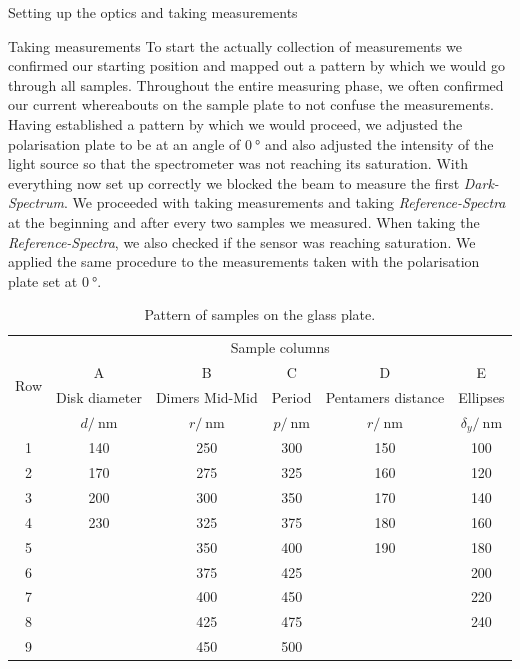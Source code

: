 \documentclass[pdftex, a4paper,11pt, twoside, UKenglish]{report}
\begin{document}
\begin{chapter}{Setting up the optics and taking measurements}
    
    
    \begin{section}{Taking measurements}
      \label{chp:SetupMeasuring}
      To start the actually collection of measurements we confirmed our starting
      position and mapped out a pattern by which we would go through all
      samples. Throughout the entire measuring phase, we often confirmed our
      current whereabouts on the sample plate to not confuse the measurements.
      Having established a pattern by which we would proceed, we adjusted the
      polarisation plate to be at an angle of $\SI{0}{\degree}$ and also
      adjusted the intensity of the light source so that the spectrometer was
      not reaching its saturation. \newline
      With everything now set up correctly we blocked the beam to measure the
      first \textit{Dark-Spectrum}. We proceeded with taking measurements and
      taking \textit{Reference-Spectra} at the beginning and after every two
      samples we measured. When taking the \textit{Reference-Spectra}, we also
      checked if the sensor was reaching saturation. \newline
      We applied the same procedure to the measurements taken with the
      polarisation plate set at $\SI{0}{\degree}$.
      
      \begin{table}[htbp]
        \centering
        \begin{tabular}{|c|c|c|c|c|c|}
          \hline
          \multirow{4}{*}{Row} & \multicolumn{5}{|c|}{Sample columns} 
          \\ \cline{2-6}
          & A & B & C & D & E \\
          & Disk diameter & Dimers Mid-Mid & Period & Pentamers distance
          & Ellipses  \\
          & $d /\SI{}{\nano\meter}$ & $r /\SI{}{\nano\meter}$
          & $p/\SI{}{\nano\meter}$ & $r /\SI{}{\nano\meter}$
          & $\delta_{y} /\SI{}{\nano\meter}$\\ \hline \hline
          1 & 140 & 250 & 300 & 150 & 100 \\ \hline 
          2 & 170 & 275 & 325 & 160 & 120 \\ \hline 
          3 & 200 & 300 & 350 & 170 & 140 \\ \hline 
          4 & 230 & 325 & 375 & 180 & 160 \\ \hline 
          5 &  & 350 & 400 & 190 & 180 \\ \hline 
          6 &  & 375 & 425 &  & 200 \\ \hline 
          7 &  & 400 & 450 &  & 220 \\ \hline 
          8 &  & 425 & 475 &  & 240 \\ \hline 
          9 &  & 450 & 500 &  &  \\ \hline 
        \end{tabular}
        \caption{Pattern of samples on the glass plate.}
        \label{tab:samplepattern}
      \end{table}
      

\end{section}
\end{chapter}
\end{document}
